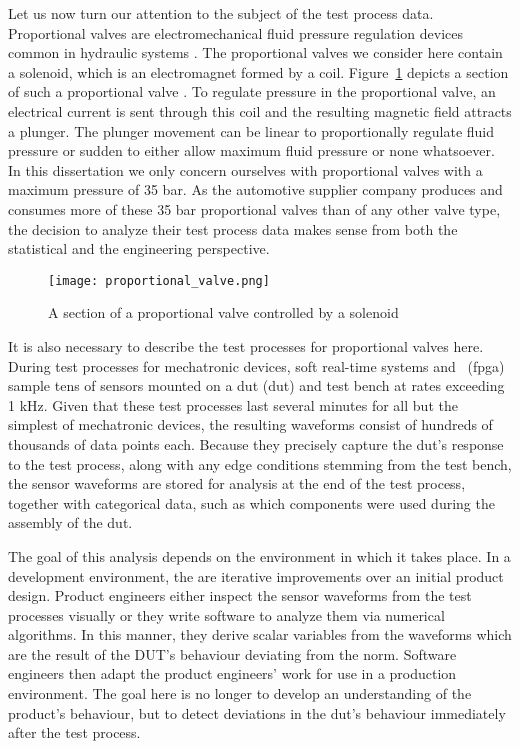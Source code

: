 Let us now turn our attention to the subject of the test process data.
Proportional valves are electromechanical fluid pressure regulation devices common in hydraulic systems \citep{DBLP:journals/tii/MazaevCH21}.
The proportional valves we consider here contain a solenoid, which is an electromagnet formed by a coil.
Figure~\ref{fig:proportional-valve} depicts a section of such a proportional valve \citep{zhang2018automotive}.
To regulate pressure in the proportional valve, an electrical current is sent through this coil and the resulting magnetic field attracts a plunger.
The plunger movement can be linear to proportionally regulate fluid pressure or sudden to either allow maximum fluid pressure or none whatsoever.
In this dissertation we only concern ourselves with proportional valves with a maximum pressure of 35 bar.
As the automotive supplier company produces and consumes more of these 35 bar proportional valves than of any other valve type, the decision to analyze their test process data makes sense from both the statistical and the engineering perspective.

\begin{figure}
  \texttt{[image: proportional\_valve.png]}
  \caption{A section of a proportional valve controlled by a solenoid \citep{zhang2018automotive}}
  \label{fig:proportional-valve}
\end{figure}

It is also necessary to describe the test processes for proportional valves here.
During test processes for mechatronic devices, soft real-time systems and ~(\acrshort{fpga}) sample tens of sensors mounted on a \acrlong{dut} (\acrshort{dut}) and test bench at rates exceeding 1 kHz.
Given that these test processes last several minutes for all but the simplest of mechatronic devices, the resulting waveforms consist of hundreds of thousands of data points each.
Because they precisely capture the \acrshort{dut}’s response to the test process, along with any edge conditions stemming from the test bench, the sensor waveforms are stored for analysis at the end of the test process, together with categorical data, such as which components were used during the assembly of the \acrshort{dut}.

The goal of this analysis depends on the environment in which it takes place.
In a development environment, the  are iterative improvements over an initial product design.
Product engineers either inspect the sensor waveforms from the test processes visually or they write software to analyze them via numerical algorithms.
In this manner, they derive scalar variables from the waveforms which are the result of the DUT’s behaviour deviating from the norm.
Software engineers then adapt the product engineers’ work for use in a production environment.
The goal here is no longer to develop an understanding of the product’s behaviour, but to detect deviations in the \acrshort{dut}’s behaviour immediately after the test process.

